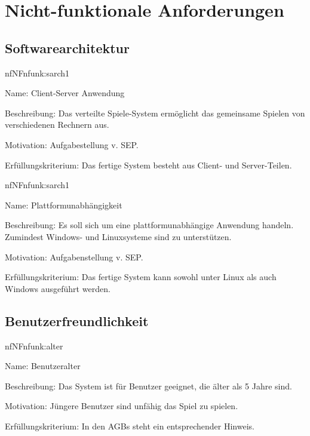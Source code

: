 \chapter{Nicht-funktionale Anforderungen}

\setcounter{nf}{10}

\section{Softwarearchitektur}

\begin{description}[leftmargin=5em, style=sameline]	
	\begin{lhp}{nf}{NF}{nfunk:sarch1}
		\item [Name:] Client-Server Anwendung
		\item [Beschreibung:] Das verteilte Spiele-System ermöglicht das gemeinsame Spielen von verschiedenen Rechnern aus.
		\item [Motivation:] Aufgabestellung v. SEP.
		\item [Erfüllungskriterium:] Das fertige System besteht aus Client- und Server-Teilen.
	\end{lhp}
	
	\begin{lhp}{nf}{NF}{nfunk:sarch1}
		\item [Name:] Plattformunabhängigkeit
		\item [Beschreibung:] Es soll sich um eine plattformunabhängige Anwendung handeln. Zumindest Windows- und Linuxsysteme sind zu unterstützen.
		\item [Motivation:] Aufgabenstellung v. SEP.
		\item [Erfüllungskriterium:]{Das fertige System kann sowohl unter Linux als auch Windows ausgeführt werden}.
	\end{lhp}
\end{description}



\section{Benutzerfreundlichkeit}


\begin{description}[leftmargin=5em, style=sameline]	
	\begin{lhp}{nf}{NF}{nfunk:alter}
		\item [Name:] Benutzeralter
		\item [Beschreibung:] Das System ist für Benutzer geeignet, die älter als 5 Jahre sind.
		\item [Motivation:] Jüngere Benutzer sind unfähig das Spiel zu spielen.
		\item [Erfüllungskriterium:] In den AGBs steht ein entsprechender Hinweis.
	\end{lhp}
\end{description}

